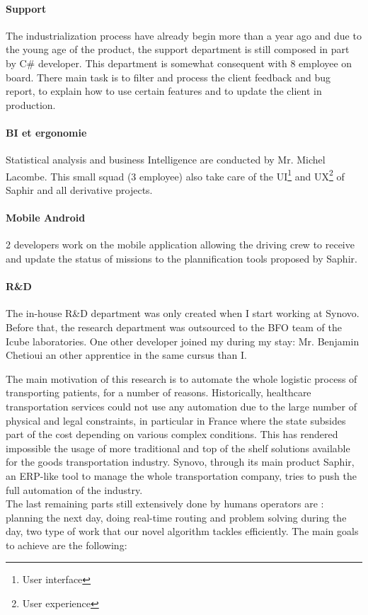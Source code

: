 \documentclass[12pt]{memoir}
\begin{document}
\paragraph{Support}\label{support}

The industrialization process have already begin more than a year ago and due to the young age of the product, the support department is still composed in part by C\# developer. This department is somewhat consequent with 8 employee on board. There main task is to filter and process the client feedback and bug report, to explain how to use certain features and to update the client in production. 


\paragraph{BI et ergonomie}\label{bi-and-UX}

Statistical analysis and business Intelligence are conducted by Mr. Michel Lacombe.
This small squad (3 employee) also take care of the UI\footnote{User interface} and
UX\footnote{User experience} of Saphir and all derivative projects.


\paragraph{Mobile Android}\label{mobile-android}

2 developers work on the mobile application allowing the driving crew to receive and update the status of missions to the plannification tools proposed by Saphir.

\paragraph{R\&D}\label{rd}

The in-house R\&D department was only created when I start working at Synovo.
Before that, the research department was outsourced to the BFO team of the Icube laboratories. 
One other developer joined my during my stay: Mr. Benjamin Chetioui an other apprentice in the same cursus than I.


\label{sub:Synovo}

\label{sec:Context of research}
\bigskip
The main motivation of this research is to automate the whole logistic process of
transporting patients, for a number of reasons. Historically, healthcare transportation
services could not use any automation due to the large number of physical and legal
constraints, in particular in France where the state subsides part of the cost
depending on various complex conditions. This has rendered impossible the usage of
more traditional and top of the shelf solutions available for the goods
transportation industry. Synovo, through its main product Saphir, an ERP-like tool
to manage the whole transportation company, tries to push the full automation of the
industry. \\
The last remaining parts still extensively done by humans operators are : planning the
next day, doing real-time routing and problem solving during the day, two type of
work that our novel algorithm tackles efficiently. The main goals to achieve are the
following:
\end{document}
